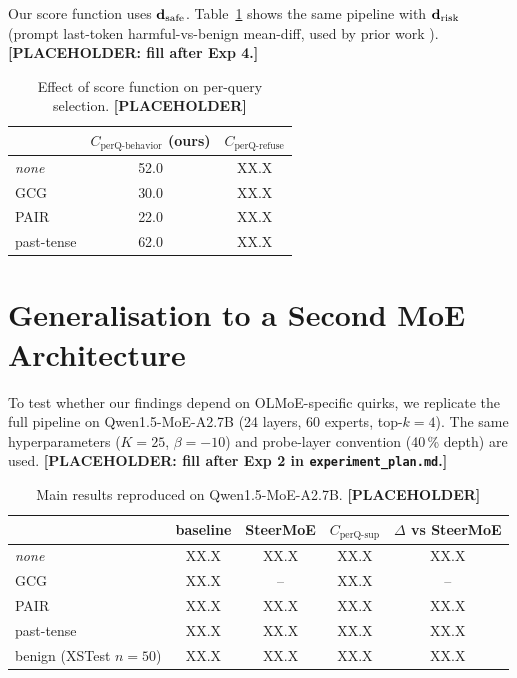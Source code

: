 Our score function uses $\mathbf{d}_{\text{safe}}$. Table~\ref{tab:drefuse} shows the same
pipeline with $\mathbf{d}_{\text{risk}}$ (prompt last-token harmful-vs-benign mean-diff,
used by prior work \cite{arditi2024refusal}).
\textbf{[PLACEHOLDER: fill after Exp 4.]}

\begin{table}[h]
\centering
\caption{Effect of score function on per-query selection.
\textbf{[PLACEHOLDER]}}
\label{tab:drefuse}
\small
\begin{tabular}{lcc}
\toprule
 & $C_{\text{perQ-behavior}}$ (ours) & $C_{\text{perQ-refuse}}$ \\
\midrule
\emph{none}      & 52.0 & XX.X \\
GCG              & 30.0 & XX.X \\
PAIR             & 22.0 & XX.X \\
past-tense       & 62.0 & XX.X \\
\bottomrule
\end{tabular}
\end{table}

\section{Generalisation to a Second MoE Architecture}
\label{app:qwen_moe}

To test whether our findings depend on OLMoE-specific quirks, we
replicate the full pipeline on Qwen1.5-MoE-A2.7B (24 layers, 60
experts, top-$k{=}4$). The same hyperparameters ($K{=}25$,
$\beta{=}{-}10$) and probe-layer convention (40\,\% depth) are used.
\textbf{[PLACEHOLDER: fill after Exp 2 in \texttt{experiment\_plan.md}.]}

\begin{table}[h]
\centering
\caption{Main results reproduced on Qwen1.5-MoE-A2.7B. \textbf{[PLACEHOLDER]}}
\label{tab:qwen_moe}
\small
\begin{tabular}{lcccc}
\toprule
 & baseline & SteerMoE & $C_{\text{perQ-sup}}$ & $\Delta$ vs SteerMoE \\
\midrule
\emph{none}        & XX.X & XX.X & XX.X & XX.X \\
GCG                & XX.X & --   & XX.X & -- \\
PAIR               & XX.X & XX.X & XX.X & XX.X \\
past-tense         & XX.X & XX.X & XX.X & XX.X \\
\midrule
benign (XSTest $n{=}50$) & XX.X & XX.X & XX.X & XX.X \\
\bottomrule
\end{tabular}
\end{table}

